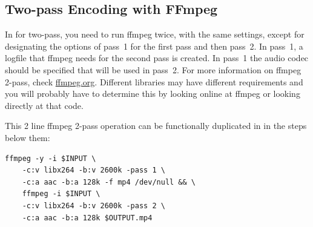 \subsection{Two-pass Encoding with FFmpeg}%
\label{sub:two_pass_encoding_ffmpeg}

In \CGG{} for two-pass, you need to run ffmpeg twice, with the same
settings, except for designating the options of pass~1 for the first
pass and then pass~2.  In pass~1, a logfile that ffmpeg needs for
the second pass is created.  In pass~1 the audio codec should be
specified that will be used in pass~2.  For more information on
ffmpeg 2-pass, check
\href{https://trac.ffmpeg.org/wiki/Encode/H.264}{ffmpeg.org}.
Different libraries may have different requirements and you will
probably have to determine this by looking online at ffmpeg or
looking directly at that code.

This 2 line ffmpeg 2-pass operation can be functionally duplicated
in \CGG{} in the steps below them:

\begin{lstlisting}[style=sh]
	ffmpeg -y -i $INPUT \
	-c:v libx264 -b:v 2600k -pass 1 \
	-c:a aac -b:a 128k -f mp4 /dev/null && \
	ffmpeg -i $INPUT \
	-c:v libx264 -b:v 2600k -pass 2 \
	-c:a aac -b:a 128k $OUTPUT.mp4
\end{lstlisting}


